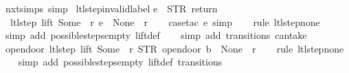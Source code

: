 \begin{isabellebody}
\isamarkupfalse%
%
\endisatagproof
{\isafoldproof}%
%
\isadelimproof
\isanewline
%
\endisadelimproof
\isanewline
{}\isamarkupfalse%
\ nxt{\isachardot}simps\ {\isacharbrackleft}simp{\isacharbrackright}\isanewline
\isanewline
{}\isamarkupfalse%
\ ltl{\isacharunderscore}step{\isacharunderscore}{}{\isacharunderscore}invalid{\isacharunderscore}label{\isacharcolon}\isanewline
{\isachardoublequoteopen}e\ {\isasymnoteq}\ {\isacharparenleft}STR\ {\isacharprime}{\isacharprime}return{\isacharprime}{\isacharprime}{\isacharcomma}\ {\isacharbrackleft}{\isacharbrackright}{\isacharparenright}\ {\isasymLongrightarrow}\isanewline
\ \ ltl{\isacharunderscore}step\ lift\ {\isacharparenleft}Some\ {}{\isacharparenright}\ r\ e\ {\isacharequal}\ {\isacharparenleft}None{\isacharcomma}\ {\isacharbrackleft}{\isacharbrackright}{\isacharcomma}\ r{\isacharparenright}{\isachardoublequoteclose}\isanewline
%
\isadelimproof
\ \ %
\endisadelimproof
%
\isatagproof
{}\isamarkupfalse%
\ {\isacharparenleft}case{\isacharunderscore}tac\ e{\isacharcomma}\ simp{\isacharparenright}\isanewline
\ \ \isamarkupfalse%
\ {\isacharparenleft}rule\ ltl{\isacharunderscore}step{\isacharunderscore}none{\isacharparenright}\isanewline
\ \ \isamarkupfalse%
\ {\isacharparenleft}simp\ add{\isacharcolon}\ possible{\isacharunderscore}steps{\isacharunderscore}empty\ lift{\isacharunderscore}def{\isacharparenright}\isanewline
\ \ \isamarkupfalse%
\ {\isacharparenleft}simp\ add{\isacharcolon}\ transitions\ can{\isacharunderscore}take{\isacharparenright}%
\endisatagproof
{\isafoldproof}%
%
\isadelimproof
\isanewline
%
\endisadelimproof
\isanewline
{}\isamarkupfalse%
\ opendoor{\isacharunderscore}{}{\isacharcolon}\ {\isachardoublequoteopen}ltl{\isacharunderscore}step\ lift\ {\isacharparenleft}Some\ {}{\isacharparenright}\ r\ {\isacharparenleft}STR\ {\isacharprime}{\isacharprime}opendoor{\isacharprime}{\isacharprime}{\isacharcomma}\ b{\isacharparenright}\ {\isacharequal}\ {\isacharparenleft}None{\isacharcomma}\ {\isacharbrackleft}{\isacharbrackright}{\isacharcomma}\ r{\isacharparenright}{\isachardoublequoteclose}\isanewline
%
\isadelimproof
\ \ %
\endisadelimproof
%
\isatagproof
{}\isamarkupfalse%
\ {\isacharparenleft}rule\ ltl{\isacharunderscore}step{\isacharunderscore}none{\isacharparenright}\isanewline
\ \ \isamarkupfalse%
\ {\isacharparenleft}simp\ add{\isacharcolon}\ possible{\isacharunderscore}steps{\isacharunderscore}empty\ lift{\isacharunderscore}def\ transitions{\isacharparenright}%

\end{isabellebody}
